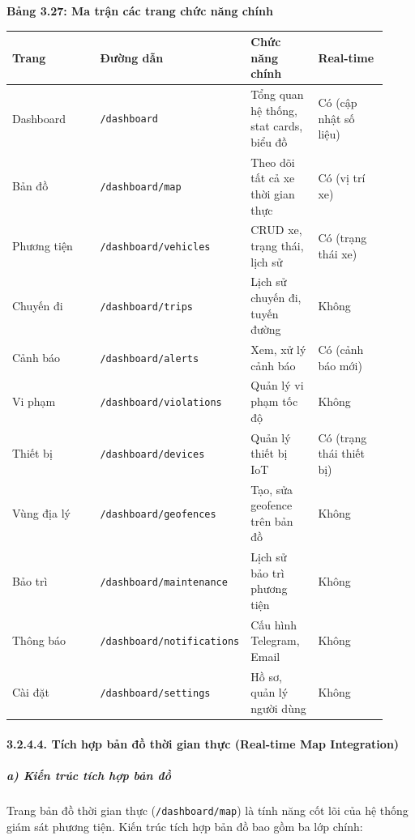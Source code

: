 \documentclass[13pt,a4paper]{extarticle}
\newcounter{none} %
\newcommand{\thesislongtableorignewline}{}
\let\thesislongtableorignewline\\
\renewcommand{\\}{\thesislongtableorignewline\hline}%
\let\\\thesislongtableorignewline
\newcommand{\thesistabletitle}[1]{%
  \begin{center}\textbf{#1}\end{center}%
}
\begin{document}
\thesistabletitle{Bảng 3.27: Ma trận các trang chức năng chính}

{\def\LTcaptype{none} %
\begin{longtable}{|p{0.30\linewidth}|p{0.16\linewidth}|p{0.20\linewidth}|p{0.26\linewidth}|}
\hline \textbf{Trang} & \textbf{Đường dẫn} & \textbf{Chức năng chính} & \textbf{Real-time} \\
\hline
\endhead
\hline
\endlastfoot
Dashboard & \texttt{/dashboard} & Tổng quan hệ thống, stat cards, biểu
đồ & Có (cập nhật số liệu) \\
Bản đồ & \texttt{/dashboard/map} & Theo dõi tất cả xe thời gian thực &
Có (vị trí xe) \\
Phương tiện & \texttt{/dashboard/vehicles} & CRUD xe, trạng thái, lịch
sử & Có (trạng thái xe) \\
Chuyến đi & \texttt{/dashboard/trips} & Lịch sử chuyến đi, tuyến đường &
Không \\
Cảnh báo & \texttt{/dashboard/alerts} & Xem, xử lý cảnh báo & Có (cảnh
báo mới) \\
Vi phạm & \nolinkurl{/dashboard/violations} & Quản lý vi phạm tốc độ &
Không \\
Thiết bị & \texttt{/dashboard/devices} & Quản lý thiết bị IoT & Có
(trạng thái thiết bị) \\
Vùng địa lý & \texttt{/dashboard/geofences} & Tạo, sửa geofence trên bản
đồ & Không \\
Bảo trì & \nolinkurl{/dashboard/maintenance} & Lịch sử bảo trì phương tiện
& Không \\
Thông báo & \nolinkurl{/dashboard/notifications} & Cấu hình Telegram, Email
& Không \\
Cài đặt & \texttt{/dashboard/settings} & Hồ sơ, quản lý người dùng &
Không \\
\end{longtable}
}

\paragraph{3.2.4.4. Tích hợp bản đồ thời gian thực (Real-time Map
Integration)}\label{3244-tuxedch-hux1ee3p-bux1ea3n-ux111ux1ed3-thux1eddi-gian-thux1ef1c-real-time-map-integration}

\subparagraph{a) Kiến trúc tích hợp bản
đồ}\label{a-kiux1ebfn-truxfac-tuxedch-hux1ee3p-bux1ea3n-ux111ux1ed3}

Trang bản đồ thời gian thực (\texttt{/dashboard/map}) là tính năng cốt
lõi của hệ thống giám sát phương tiện. Kiến trúc tích hợp bản đồ bao gồm
ba lớp chính:
\end{document}

